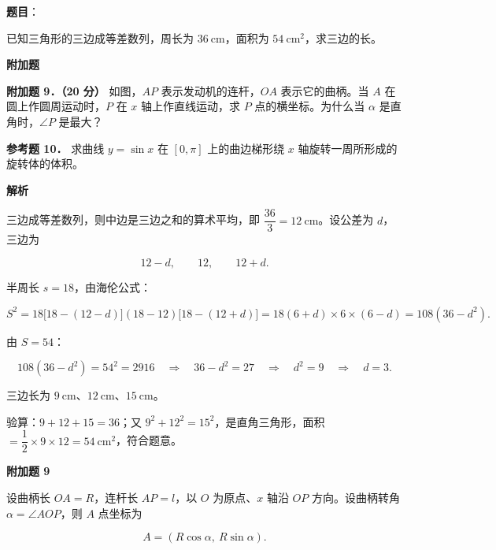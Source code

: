 \begin{answer}

\textbf{题目}：

已知三角形的三边成等差数列，周长为 $36\ \mathrm{cm}$，面积为 $54\ \mathrm{cm^2}$，求三边的长。

\begin{gktip}
\Needspace{0.25\textheight}
\textbf{附加题}
\end{gktip}

\textbf{附加题 9．（20 分）} 如图，$AP$ 表示发动机的连杆，$OA$ 表示它的曲柄。当 $A$ 在圆上作圆周运动时，$P$ 在 $x$ 轴上作直线运动，求 $P$ 点的横坐标。为什么当 $\alpha$ 是直角时，$\angle P$ 是最大？
\nopagebreak[4]
\begin{center}\end{center}
\nopagebreak[4]
\textbf{参考题 10．} 求曲线 $y=\sin x$ 在 $[0,\pi]$ 上的曲边梯形绕 $x$ 轴旋转一周所形成的旋转体的体积。

\textbf{解析}

三边成等差数列，则中边是三边之和的算术平均，即 $\dfrac{36}{3}=12\ \mathrm{cm}$。设公差为 $d$，三边为

\nopagebreak[4]
\[
12-d,\qquad 12,\qquad 12+d.
\]

半周长 $s=18$，由海伦公式：

\nopagebreak[4]
\[
S^2=18\bigl[18-(12-d)\bigr](18-12)\bigl[18-(12+d)\bigr]
=18(6+d)\times6\times(6-d)
=108(36-d^2).
\]

由 $S=54$：

\nopagebreak[4]
\[
108(36-d^2)=54^2=2916
\quad\Longrightarrow\quad
36-d^2=27
\quad\Longrightarrow\quad
d^2=9
\quad\Longrightarrow\quad
d=3.
\]

三边长为 $9\ \mathrm{cm}$、$12\ \mathrm{cm}$、$15\ \mathrm{cm}$。

验算：$9+12+15=36$；又 $9^2+12^2=15^2$，是直角三角形，面积 $=\dfrac12\times9\times12=54\ \mathrm{cm^2}$，符合题意。

\textbf{附加题 9}
\nopagebreak[4]
\begin{center}\end{center}
\nopagebreak[4]
设曲柄长 $OA=R$，连杆长 $AP=l$，以 $O$ 为原点、$x$ 轴沿 $OP$ 方向。设曲柄转角 $\alpha=\angle AOP$，则 $A$ 点坐标为

\nopagebreak[4]
\[
A=(R\cos\alpha,\ R\sin\alpha).
\]


\end{answer}
